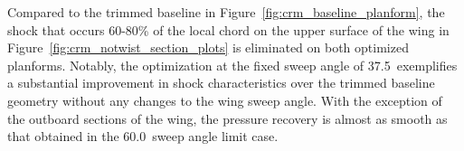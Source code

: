 Compared to the trimmed baseline in Figure~\ref{fig:crm_baseline_planform}, the shock that occurs 60-80\% of the local chord on the upper surface of the wing in Figure~\ref{fig:crm_notwist_section_plots} is eliminated on both optimized planforms.
Notably, the optimization at the fixed sweep angle of 37.5\degree\ exemplifies a substantial improvement in shock characteristics over the trimmed baseline geometry without any changes to the wing sweep angle. With the exception of the outboard sections of the wing, the pressure recovery is almost as smooth as that obtained in the 60.0\degree\ sweep angle limit case.

